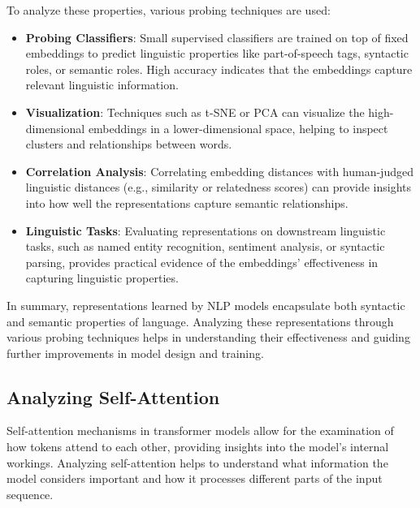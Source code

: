 To analyze these properties, various probing techniques are used:
\begin{itemize}
    \item \textbf{Probing Classifiers}: Small supervised classifiers are trained on top of fixed embeddings to predict linguistic properties like part-of-speech tags, syntactic roles, or semantic roles. High accuracy indicates that the embeddings capture relevant linguistic information.
    \item \textbf{Visualization}: Techniques such as t-SNE or PCA can visualize the high-dimensional embeddings in a lower-dimensional space, helping to inspect clusters and relationships between words.
    \item \textbf{Correlation Analysis}: Correlating embedding distances with human-judged linguistic distances (e.g., similarity or relatedness scores) can provide insights into how well the representations capture semantic relationships.
    \item \textbf{Linguistic Tasks}: Evaluating representations on downstream linguistic tasks, such as named entity recognition, sentiment analysis, or syntactic parsing, provides practical evidence of the embeddings' effectiveness in capturing linguistic properties.
\end{itemize}

In summary, representations learned by NLP models encapsulate both syntactic and semantic properties of language. Analyzing these representations through various probing techniques helps in understanding their effectiveness and guiding further improvements in model design and training.


\subsection{Analyzing Self-Attention}

Self-attention mechanisms in transformer models allow for the examination of how tokens attend to each other, providing insights into the model's internal workings. Analyzing self-attention helps to understand what information the model considers important and how it processes different parts of the input sequence.


